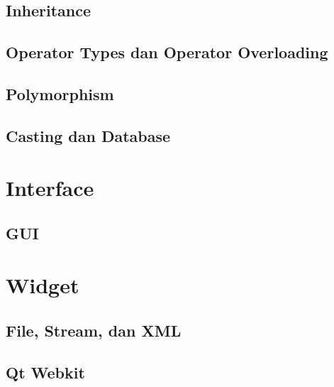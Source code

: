 \documentclass[11pt,b5paper,oneside,titlepage]{book}
\begin{document}
	\chapter{Inheritance}\label{inheritance}
	
	
	\chapter{Operator Types dan Operator Overloading}\label{operator-types-dan-operator-overloading}
	
	
	\chapter{Polymorphism}\label{polymorphism}
	

	\chapter{Casting dan Database}\label{casting-dan-database}
	

	\part{Interface}

	\chapter{GUI}
	

	\part{Widget}
	
	\chapter{File, Stream, dan XML}\label{file-stream-dan-xml}
	

	\chapter{Qt Webkit}
		
		
\end{document}
